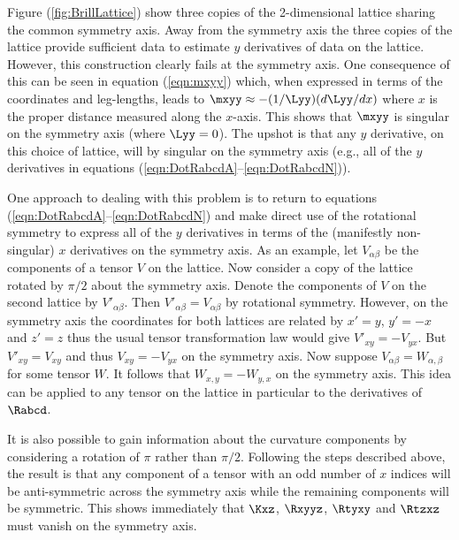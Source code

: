 \documentclass[a4paper,12pt]{article}
\numberwithin{equation}{section}
\begin{document}
Figure (\ref{fig:BrillLattice}) show three copies of the 2-dimensional lattice sharing the
common symmetry axis. Away from the symmetry axis the three copies of the lattice provide
sufficient data to estimate $y$ derivatives of data on the lattice. However, this
construction clearly fails at the symmetry axis. One consequence of this can be seen in
equation (\ref{eqn:mxyy}) which, when expressed in terms of the coordinates and leg-lengths,
leads to $\mxyy\approx - (1/\Lyy)(d\Lyy/dx)$ where $x$ is the proper distance measured along
the $x$-axis. This shows that $\mxyy$ is singular on the symmetry axis (where $\Lyy=0$). The
upshot is that any $y$ derivative, on this choice of lattice, will by singular on the
symmetry axis (e.g., all of the $y$ derivatives in equations
(\ref{eqn:DotRabcdA}--\ref{eqn:DotRabcdN})).

One approach to dealing with this problem is to return to equations
(\ref{eqn:DotRabcdA}--\ref{eqn:DotRabcdN}) and make direct use of the rotational symmetry to
express all of the $y$ derivatives in terms of the (manifestly non-singular) $x$ derivatives
on the symmetry axis. As an example, let $V_{\alpha\beta}$ be the components of a tensor $V$
on the lattice. Now consider a copy of the lattice rotated by $\pi/2$ about the symmetry
axis. Denote the components of $V$ on the second lattice by $V'_{\alpha\beta}$. Then
$V'_{\alpha\beta} = V_{\alpha\beta}$ by rotational symmetry. However, on the symmetry axis
the coordinates for both lattices are related by $x'=y$, $y'=-x$ and $z'=z$ thus the usual
tensor transformation law would give $V'_{xy}=-V_{yx}$. But $V'_{xy}=V_{xy}$ and thus
$V_{xy}=-V_{yx}$ on the symmetry axis. Now suppose $V_{\alpha\beta} = W_{\alpha,\beta}$ for
some tensor $W$. It follows that $W_{x,y}=-W_{y,x}$ on the symmetry axis. This idea can be
applied to any tensor on the lattice in particular to the derivatives of $\Rabcd$.

It is also possible to gain information about the curvature components by considering a
rotation of $\pi$ rather than $\pi/2$. Following the steps described above, the result is
that any component of a tensor with an odd number of $x$ indices will be anti-symmetric
across the symmetry axis while the remaining components will be symmetric. This shows
immediately that $\Kxz$, $\Rxyyz$, $\Rtyxy$ and $\Rtzxz$ must vanish on the symmetry axis.
\end{document}
